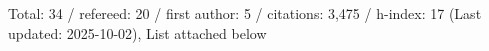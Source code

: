 Total: 34 / refereed: 20 / first author: 5 / citations: 3,475 / h-index: 17 (Last updated: 2025-10-02), List attached below